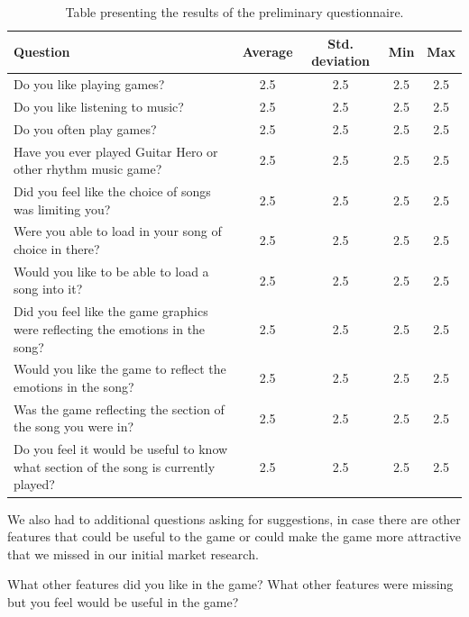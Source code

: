 \begin{table}
\begin{center}
\begin{tabular}{| p{8cm} | c | c | c | c | } \hline 
 Question & Average & Std. deviation & Min & Max \\ \hline \hline

Do you like playing games? & 2.5 & 2.5 & 2.5 & 2.5\\ \hline 
Do you like listening to music? & 2.5 & 2.5 & 2.5 & 2.5\\ \hline 
Do you often play games? & 2.5 & 2.5 & 2.5 & 2.5 \\ \hline 
Have you ever played Guitar Hero or other rhythm music game? & 2.5 & 2.5  & 2.5 & 2.5\\ \hline 
Did you feel like the choice of songs was limiting you? & 2.5 & 2.5 & 2.5 & 2.5 \\ \hline 
Were you able to load in your song of choice in there? & 2.5 & 2.5 & 2.5 & 2.5 \\ \hline 
Would you like to be able to load a song into it? & 2.5 & 2.5 & 2.5 & 2.5 \\ \hline 
Did you feel like the game graphics were reflecting the emotions in the song? & 2.5 & 2.5 & 2.5 & 2.5 \\ \hline 
Would you like the game to reflect the emotions in the song? & 2.5 & 2.5 & 2.5 & 2.5 \\ \hline 
Was the game reflecting the section of the song you were in? & 2.5 & 2.5 & 2.5 & 2.5 \\ \hline 
Do you feel it would be useful to know what section of the song is currently  played? & 2.5 & 2.5 & 2.5 & 2.5 \\ \hline 

\end{tabular}
\caption{Table presenting the results of the preliminary questionnaire.}
\label{table:preliminaryquestions}
\end{center}
\end{table}
We also had to additional questions asking for suggestions, in case there are other features that could be useful to the game or could make the game more attractive that we missed in our initial market research. 

What other features did you like in the game?
What other features were missing but you feel would be useful in the game?